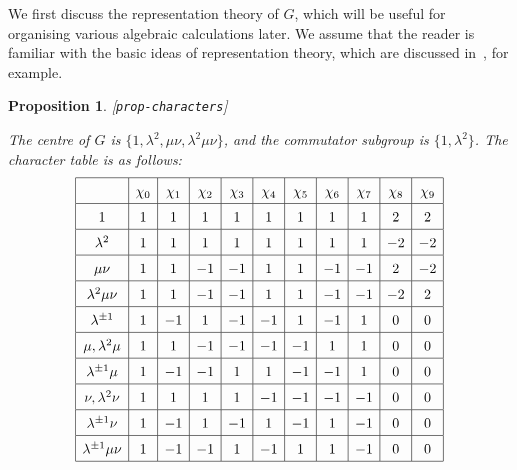 \documentclass[reqno]{amsart}
\newcommand{\lbl}[1]{\label{#1}\textup{[\texttt{#1}]}\par}
\newcommand{\lbl}{\label}
\newcommand{\lm}        {\lambda}
\renewcommand{\:}{\colon}
\newtheorem{proposition}[theorem]{Proposition}
\theoremstyle{definition}
\begin{document}
We first discuss the representation theory of $G$, which will be useful
for organising various algebraic calculations later.  We assume that
the reader is familiar with the basic ideas of representation theory,
which are discussed in~\cite{se:lrf}, for example.

\begin{proposition}\lbl{prop-characters}
 The centre of $G$ is $\{1,\lm^2,\mu\nu,\lm^2\mu\nu\}$, and the
 commutator subgroup is $\{1,\lm^2\}$.  The character table is as
 follows:
 \[ \renewcommand{\arraystretch}{1.5}
    \begin{array}{|c|c|c|c|c|c|c|c|c|c|c|} \hline
                  & \chi_0 & \chi_1 & \chi_2 & \chi_3 & \chi_4 & \chi_5 & \chi_6 & \chi_7 & \chi_8 & \chi_9 \\ \hline
                1 &  1     &  1     &  1     &  1     &  1     &  1     &  1     &  1     &  2     &  2     \\ \hline
            \lm^2 &  1     &  1     &  1     &  1     &  1     &  1     &  1     &  1     & -2     & -2     \\ \hline
           \mu\nu &  1     &  1     & -1     & -1     &  1     &  1     & -1     & -1     &  2     & -2     \\ \hline
      \lm^2\mu\nu &  1     &  1     & -1     & -1     &  1     &  1     & -1     & -1     & -2     &  2     \\ \hline
      \lm^{\pm 1} &  1     & -1     &  1     & -1     & -1     &  1     & -1     &  1     &  0     &  0     \\ \hline
     \mu,\lm^2\mu &  1     &  1     & -1     & -1     & -1     & -1     &  1     &  1     &  0     &  0     \\ \hline
   \lm^{\pm 1}\mu &  1     & -1     & -1     &  1     &  1     & -1     & -1     &  1     &  0     &  0     \\ \hline
     \nu,\lm^2\nu &  1     &  1     &  1     &  1     & -1     & -1     & -1     & -1     &  0     &  0     \\ \hline
   \lm^{\pm 1}\nu &  1     & -1     &  1     & -1     &  1     & -1     &  1     & -1     &  0     &  0     \\ \hline
\lm^{\pm 1}\mu\nu &  1     & -1     & -1     &  1     & -1     &  1     &  1     & -1     &  0     &  0     \\ \hline
   \end{array}
 \]
\end{proposition}
\end{document}
